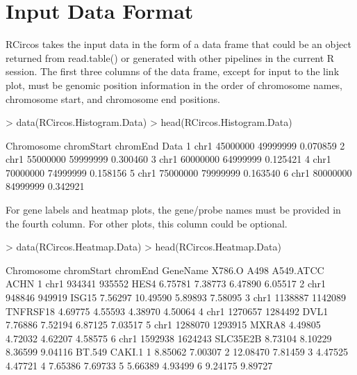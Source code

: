 \documentclass{article}
\begin{document}
\section{Input Data Format}

RCircos takes the input data in the form of a data frame that could be an object returned from read.table() or generated with other pipelines in the current R session. The first three columns of the data frame, except for input to the link plot,  must be genomic position information in the order of chromosome names, chromosome start, and chromosome end positions. 

\begin{Schunk}
\begin{Sinput}
> data(RCircos.Histogram.Data)
> head(RCircos.Histogram.Data)
\end{Sinput}
\begin{Soutput}
  Chromosome chromStart chromEnd     Data
1       chr1   45000000 49999999 0.070859
2       chr1   55000000 59999999 0.300460
3       chr1   60000000 64999999 0.125421
4       chr1   70000000 74999999 0.158156
5       chr1   75000000 79999999 0.163540
6       chr1   80000000 84999999 0.342921
\end{Soutput}
\end{Schunk}


For gene labels and heatmap plots, the gene/probe names must be provided in the fourth column. For other plots, this column could be optional. 

\begin{Schunk}
\begin{Sinput}
> data(RCircos.Heatmap.Data)
> head(RCircos.Heatmap.Data)
\end{Sinput}
\begin{Soutput}
  Chromosome chromStart chromEnd GeneName  X786.O     A498 A549.ATCC    ACHN
1       chr1     934341   935552     HES4 6.75781  7.38773   6.47890 6.05517
2       chr1     948846   949919    ISG15 7.56297 10.49590   5.89893 7.58095
3       chr1    1138887  1142089 TNFRSF18 4.69775  4.55593   4.38970 4.50064
4       chr1    1270657  1284492     DVL1 7.76886  7.52194   6.87125 7.03517
5       chr1    1288070  1293915    MXRA8 4.49805  4.72032   4.62207 4.58575
6       chr1    1592938  1624243 SLC35E2B 8.73104  8.10229   8.36599 9.04116
    BT.549  CAKI.1
1  8.85062 7.00307
2 12.08470 7.81459
3  4.47525 4.47721
4  7.65386 7.69733
5  5.66389 4.93499
6  9.24175 9.89727
\end{Soutput}
\end{Schunk}
\end{document}
